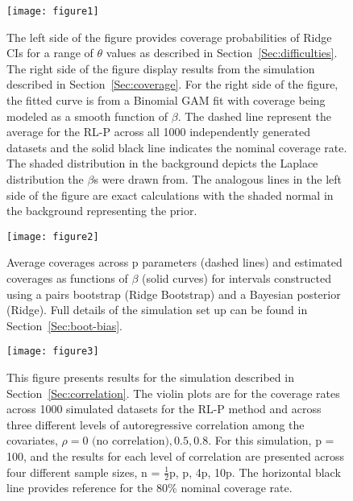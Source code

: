 \begin{figure}[htb!]
  \begin{center}
  \texttt{[image: figure1]}
  \caption{\label{Fig:laplace} The left side of the figure provides coverage probabilities of Ridge CIs for a range of $\theta$ values as described in Section~\ref{Sec:difficulties}. The right side of the figure display results from the simulation described in Section~\ref{Sec:coverage}. For the right side of the figure, the fitted curve is from a Binomial GAM fit with coverage being modeled as a smooth function of $\beta$. The dashed line represent the average for the RL-P across all 1000 independently generated datasets and the solid black line indicates the nominal coverage rate. The shaded distribution in the background depicts the Laplace distribution the $\beta$s were drawn from. The analogous lines in the left side of the figure are exact calculations with the shaded normal in the background representing the prior.}
  \end{center}
\end{figure}

\begin{figure}[htb!]
  \begin{center}
  \texttt{[image: figure2]}
  \caption{\label{Fig:ridge_converge} Average coverages across p parameters (dashed lines) and estimated coverages as functions of $\beta$ (solid curves) for intervals constructed using a pairs bootstrap (Ridge Bootstrap) and a Bayesian posterior (Ridge). Full details of the simulation set up can be found in Section~\ref{Sec:boot-bias}.}
  \end{center}
\end{figure}

\begin{figure}[htb!]
  \begin{center}
  \texttt{[image: figure3]}
  \caption{\label{Fig:correlation_structure} This figure presents results for the simulation described in Section~\ref{Sec:correlation}. The violin plots are for the coverage rates across 1000 simulated datasets for the RL-P method and across three different levels of autoregressive correlation among the covariates, $\rho = 0 \text{ (no correlation)}, 0.5, 0.8$. For this simulation, p = 100, and the results for each level of correlation are presented across four different sample sizes, n = $\frac{1}{2}$p, p, 4p, 10p. The horizontal black line provides reference for the 80\% nominal coverage rate.}
  \end{center}
\end{figure}

